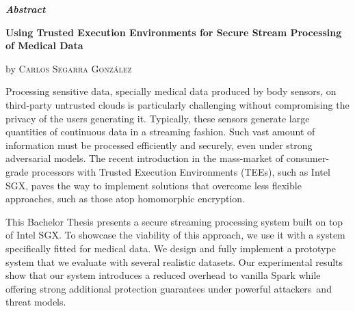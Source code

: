 \vspace*{2.00cm}
\begin{center}
%
%
%
%
%
%    

    \LARGE
    \textit{\textbf{Abstract}} \label{sec:abstract}

    \vspace{0.5cm}

    \large
    \textbf{Using Trusted Execution Environments for Secure Stream Processing of Medical Data}

    by \textsc{Carlos Segarra Gonz\'alez}
\end{center}

\vspace{0.5cm}

\normalsize
Processing sensitive data, specially medical data produced by body sensors, on third-party untrusted clouds is particularly challenging without compromising the privacy of the users generating it. Typically, these sensors generate large quantities of continuous data in a streaming fashion. Such vast amount of information must be processed efficiently and securely, even under strong adversarial models. The recent introduction in the mass-market of consumer-grade processors with Trusted Execution Environments (TEEs), such as Intel SGX, paves the way to implement solutions that overcome less flexible approaches, such as those atop homomorphic encryption. 
    
This Bachelor Thesis presents a secure streaming processing system built on top of Intel SGX. To showcase the viability of this approach, we use it with a system specifically fitted for medical data. We design and fully implement a prototype system that we evaluate with several realistic datasets. Our experimental results show that our system introduces a reduced overhead to vanilla Spark while offering strong additional protection guarantees under powerful attackers and threat models.

